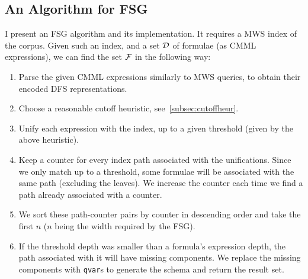 \documentclass[a4paper,oneside]{article}
\def\MWS{\textsf{MWS}\xspace}
\begin{document}
\subsection{An Algorithm for FSG}\label{subsec:fsgAlgorithm}
I present an FSG algorithm and its implementation. It requires a \MWS index of
the corpus. Given such an index, and a set $\mathcal{D}$ of formulae (as CMML
expressions), we can find the set $\mathcal{F}$ in the following way:
\begin{enumerate}
    \item Parse the given CMML expressions similarly to \MWS queries,
        to obtain their encoded DFS representations.
    \item Choose a reasonable cutoff heuristic, see~\ref{subsec:cutoffheur}.
    \item Unify each expression with the index, up to a given threshold (given by
        the above heuristic).
    \item Keep a counter for every index path associated with the unifications.
        Since we only match up to a threshold, some formulae will be associated
        with the same path (excluding the leaves).
        We increase the counter each time we find a path already associated
        with a counter.
    \item We sort these path-counter pairs by counter in descending order and
        take the first $n$ ($n$ being the width required by the FSG).
    \item If the threshold depth was smaller than a formula's expression
        depth, the path associated with it will have missing components. We
        replace the missing components with \lstinline|qvar|s to generate the
        schema and return the result set.
\end{enumerate}
\end{document}
